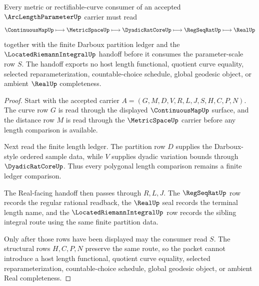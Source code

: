\begin{theorem}
\label{thm:arc-length-parameter-real-metric-handoff}
Every metric or rectifiable-curve consumer of an accepted $\ArcLengthParameterUp$ carrier must read
$$
\ContinuousMapUp \longmapsto \MetricSpaceUp \longmapsto \DyadicRatCoreUp \longmapsto \RegSeqRatUp \longmapsto \RealUp
$$
together with the finite Darboux partition ledger and the $\LocatedRiemannIntegralUp$ handoff before it consumes the parameter-scale row $S$. The handoff exports no host length functional, quotient curve equality, selected reparameterization, countable-choice schedule, global geodesic object, or ambient $\RealUp$ completeness.
\end{theorem}
\begin{proof}
Start with the accepted carrier $A=(G,M,D,V,R,L,J,S,H,C,P,N)$. The curve row $G$ is read through the displayed $\ContinuousMapUp$ surface, and the distance row $M$ is read through the $\MetricSpaceUp$ carrier before any length comparison is available.

Next read the finite length ledger. The partition row $D$ supplies the Darboux-style ordered sample data, while $V$ supplies dyadic variation bounds through $\DyadicRatCoreUp$. Thus every polygonal length comparison remains a finite ledger comparison.

The Real-facing handoff then passes through $R,L,J$. The $\RegSeqRatUp$ row records the regular rational readback, the $\RealUp$ seal records the terminal length name, and the $\LocatedRiemannIntegralUp$ row records the sibling integral route using the same finite partition data.

Only after those rows have been displayed may the consumer read $S$. The structural rows $H,C,P,N$ preserve the same route, so the packet cannot introduce a host length functional, quotient curve equality, selected reparameterization, countable-choice schedule, global geodesic object, or ambient Real completeness.
\end{proof}



